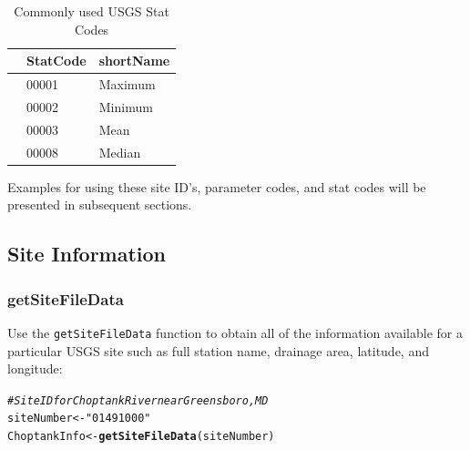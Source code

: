 \documentclass[a4paper,11pt]{article}\usepackage[]{graphicx}\usepackage[]{color}
\makeatletter
\newcommand{\hlstr}[1]{\textcolor[rgb]{0.192,0.494,0.8}{#1}}%
\newcommand{\hlcom}[1]{\textcolor[rgb]{0.678,0.584,0.686}{\textit{#1}}}%
\newcommand{\hlstd}[1]{\textcolor[rgb]{0.345,0.345,0.345}{#1}}%
\newcommand{\hlkwb}[1]{\textcolor[rgb]{0.69,0.353,0.396}{#1}}%
\newcommand{\hlkwd}[1]{\textcolor[rgb]{0.737,0.353,0.396}{\textbf{#1}}}%
\newenvironment{kframe}{%
 \def\at@end@of@kframe{}%
 \ifinner\ifhmode%
  \def\at@end@of@kframe{\end{minipage}}%
  \begin{minipage}{\columnwidth}%
 \fi\fi%
 \def\FrameCommand##1{\hskip\@totalleftmargin \hskip-\fboxsep
 \colorbox{shadecolor}{##1}\hskip-\fboxsep
     \hskip-\linewidth \hskip-\@totalleftmargin \hskip\columnwidth}%
 \MakeFramed {\advance\hsize-\width
   \@totalleftmargin\z@ \linewidth\hsize
   \@setminipage}}%
 {\par\unskip\endMakeFramed%
 \at@end@of@kframe}
\newenvironment{knitrout}{}{} %
\makeatother
\begin{document}
\begin{table}[ht]
\caption{Commonly used USGS Stat Codes} 
\label{tab:stat}
{\footnotesize
\begin{tabular}{rll}
  \hline
 & \multicolumn{1}{c}{\textbf{\textsf{StatCode}}} & \multicolumn{1}{c}{\textbf{\textsf{shortName}}} \\ 
  \hline
 & 00001 & Maximum \\ 
  [5pt] & 00002 & Minimum \\ 
  [5pt] & 00003 & Mean \\ 
  [5pt] & 00008 & Median \\ 
   \hline
\end{tabular}
}
\end{table}


Examples for using these site ID's, parameter codes, and stat codes will be presented in subsequent sections.

\FloatBarrier

\subsection{Site Information}
\label{sec:usgsSite}

\subsubsection{getSiteFileData}
\label{sec:usgsSiteFileData}
Use the \texttt{getSiteFileData} function to obtain all of the information available for a particular USGS site such as full station name, drainage area, latitude, and longitude:


\begin{knitrout}
\color{fgcolor}\begin{kframe}
\begin{alltt}
\hlcom{# Site ID for Choptank River near Greensboro, MD}
\hlstd{siteNumber} \hlkwb{<-} \hlstr{"01491000"}
\hlstd{ChoptankInfo} \hlkwb{<-} \hlkwd{getSiteFileData}\hlstd{(siteNumber)}
\end{alltt}
\end{kframe}
\end{knitrout}
\end{document}
